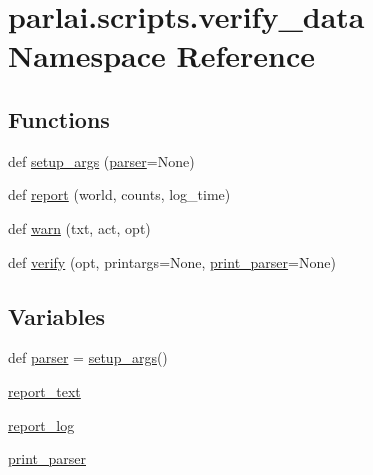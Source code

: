 \hypertarget{namespaceparlai_1_1scripts_1_1verify__data}{}\section{parlai.\+scripts.\+verify\+\_\+data Namespace Reference}
\label{namespaceparlai_1_1scripts_1_1verify__data}
\subsection*{Functions}
\begin{DoxyCompactItemize}
\item 
def \hyperlink{namespaceparlai_1_1scripts_1_1verify__data_aecfb15331606adc88ee4221c2945a17d}{setup\+\_\+args} (\hyperlink{namespaceparlai_1_1scripts_1_1verify__data_a77500ea3bf26e7b433f37d4fd3c831d3}{parser}=None)
\item 
def \hyperlink{namespaceparlai_1_1scripts_1_1verify__data_a26153466b8f1f0c901768b4b3c56c885}{report} (world, counts, log\+\_\+time)
\item 
def \hyperlink{namespaceparlai_1_1scripts_1_1verify__data_ab1f264e6d69b1abe3399ba05512f8c66}{warn} (txt, act, opt)
\item 
def \hyperlink{namespaceparlai_1_1scripts_1_1verify__data_acf6da63d62b2bf71c8fb7860e944a5bf}{verify} (opt, printargs=None, \hyperlink{namespaceparlai_1_1scripts_1_1verify__data_a60c3d2c8e563b7461b6dd38ed5c389c5}{print\+\_\+parser}=None)
\end{DoxyCompactItemize}
\subsection*{Variables}
\begin{DoxyCompactItemize}
\item 
def \hyperlink{namespaceparlai_1_1scripts_1_1verify__data_a77500ea3bf26e7b433f37d4fd3c831d3}{parser} = \hyperlink{namespaceparlai_1_1scripts_1_1verify__data_aecfb15331606adc88ee4221c2945a17d}{setup\+\_\+args}()
\item 
\hyperlink{namespaceparlai_1_1scripts_1_1verify__data_ac7d7cb0342b938344a59be68a200cda0}{report\+\_\+text}
\item 
\hyperlink{namespaceparlai_1_1scripts_1_1verify__data_a72869030307af42a4d0fa97aa1f07bcf}{report\+\_\+log}
\item 
\hyperlink{namespaceparlai_1_1scripts_1_1verify__data_a60c3d2c8e563b7461b6dd38ed5c389c5}{print\+\_\+parser}
\end{DoxyCompactItemize}


